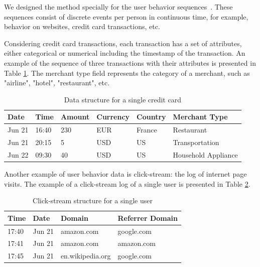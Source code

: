 \documentclass{article}
\begin{document}
We designed the method specially for the user behavior sequences~\citep{Ni2018PerceiveYU}. These sequences consist of discrete events per person in continuous time, for example,  behavior on websites, credit card transactions, etc. 

Considering credit card transactions, each transaction has a set of attributes, either categorical or numerical including the timestamp of the transaction. An example of the sequence of three transactions with their attributes is presented in Table \ref{tab-tr-data}.
The merchant type field represents the category of a merchant, such as "airline", "hotel", "restaurant", etc.

\begin{table}
\centering
\caption{Data structure for a single credit card}
\begin{tabular}{llllll}
\toprule
\textbf{Date} & \textbf{Time} & \textbf{Amount} & \textbf{Currency} & \textbf{Country} & \textbf{Merchant Type} \\
\midrule
Jun 21 & 16:40& 230 & EUR & France & Restaurant \\
Jun 21 & 20:15 & 5 & USD & US & Transportation \\
Jun 22 & 09:30 & 40 & USD & US & Household Appliance \\
\bottomrule
\end{tabular}
\label{tab-tr-data}
\end{table}

Another example of user behavior data is click-stream: the log of internet page visits. The example of a click-stream log of a single user is presented in Table \ref{tab-cs-data}.

\begin{table}
\centering
\caption{Click-stream structure for a single user}
\begin{tabular}{llll}
\toprule
\textbf{Time} & \textbf{Date} & \textbf{Domain} & \textbf{Referrer Domain} \\
\midrule
17:40 & Jun 21 & amazon.com & google.com \\
17:41 & Jun 21 & amazon.com & amazon.com \\
17:45 & Jun 21 & en.wikipedia.org & google.com \\
\bottomrule
\end{tabular}
\label{tab-cs-data}
\end{table}
\end{document}
